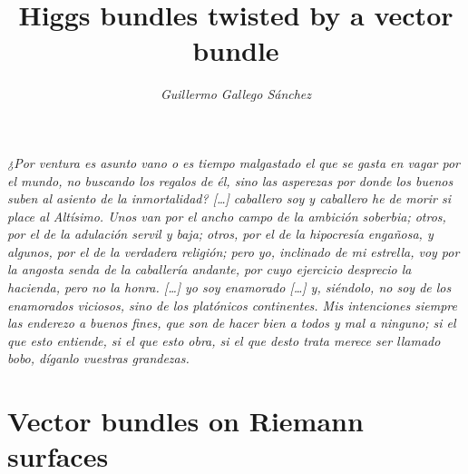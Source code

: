 \documentclass[12pt,a4paper]{book}
\title{\bfseries \sffamily Higgs bundles twisted by a vector bundle}
\author{\it Guillermo Gallego Sánchez}
\date{}
\theoremstyle{definition} \newtheorem{defn}[thm]{Definition}
\theoremstyle{definition} \newtheorem{ejemplo}[thm]{Example}
\theoremstyle{remark} \newtheorem{rem}[thm]{Remark}
\begin{document}
\maketitle
\newpage\null\thispagestyle{empty}
\newpage\null\thispagestyle{empty}
\epigraph{\textit{¿Por ventura es asunto vano o es tiempo malgastado el que se gasta en vagar por el mundo, no buscando los regalos de él, sino las
asperezas por donde los buenos suben al asiento de la inmortalidad? [\dots] caballero soy y caballero he de morir si place al Altísimo. Unos van por el
ancho campo de la ambición soberbia; otros, por el de la adulación servil y baja; otros, por el de la hipocresía engañosa, y algunos, por el de la 
verdadera religión; pero yo, inclinado de mi estrella, voy por la angosta senda de la caballería andante, por cuyo ejercicio desprecio la hacienda, pero
no la honra. [\dots] yo soy enamorado [\dots] y, siéndolo, no soy de los enamorados viciosos, sino de los platónicos continentes. Mis intenciones siempre
las enderezo a buenos fines, que son de hacer bien a todos y mal a ninguno; si el que esto entiende, si el que esto obra, si el que desto trata merece
ser llamado bobo, díganlo vuestras grandezas.}}{}
\tableofcontents
\chapter{Vector bundles on Riemann surfaces}
\end{document}
